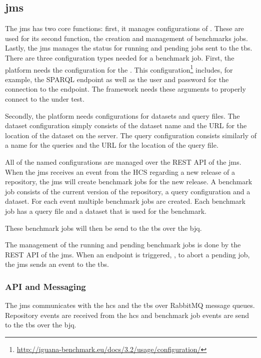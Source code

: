 \subsection{\acl{jms}}
\label{sec:jobs_managing_service}
The \acf{jms} has two core functions: first, it manages configurations of \tsp{}.
These are used for its second function, the creation and management of benchmarks jobs.
Lastly, the \ac{jms} manages the status for running and pending jobs sent to the \ac{tbs}.
\\

There are three configuration types needed for a benchmark job.
First, the platform needs the configuration for the \ts{}.
This configuration\footnote{\url{http://iguana-benchmark.eu/docs/3.2/usage/configuration/}} includes, for example, the SPARQL endpoint as well as the user and password for the connection to the endpoint.
The \iguana{} framework needs these arguments to properly connect to the \ts{} under test.

Secondly, the platform needs configurations for datasets and query files.
The dataset configuration simply consists of the dataset name and the URL for the location of the dataset on the server.
The query configuration consists similarly of a name for the queries and the URL for the location of the query file.

All of the named configurations are managed over the REST API of the \ac{jms}.
\\

When the \ac{jms} receives an event from the HCS regarding a new release of a repository, the \ac{jms} will create benchmark jobs for the new release.
A benchmark job consists of the current version of the repository, a query configuration and a dataset.
For each event multiple benchmark jobs are created.
Each benchmark job has a query file and a dataset that is used for the benchmark.

These benchmark jobs will then be send to the \ac{tbs} over the \acl{bjq}.

The management of the running and pending benchmark jobs is done by the REST API of the \ac{jms}.
When an endpoint is triggered, \eg, to abort a pending job, the \ac{jms} sends an event to the \ac{tbs}.


\subsubsection{API and Messaging}
\label{sec:jobs_api}
The \ac{jms} communicates with the \ac{hcs} and the \ac{tbs} over RabbitMQ message queues.
Repository events are received from the \ac{hcs} and benchmark job events are send to the \ac{tbs} over the \ac{bjq}.
\\

